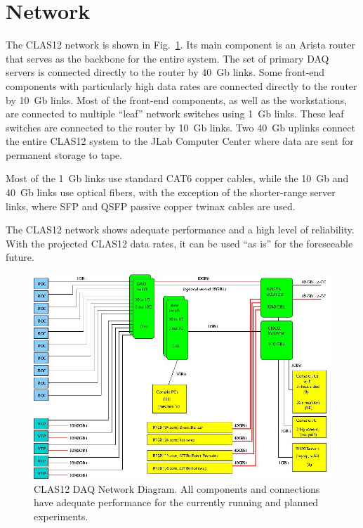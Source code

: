 \section{Network}

The CLAS12 network is shown in Fig.~\ref{fig:network_diagram}. Its main component is an Arista router that serves
as the backbone for the entire system. The set of primary DAQ servers is connected directly to the router by 40~Gb
links. Some front-end components with particularly high data rates are connected directly to the router by 10~Gb links.
Most of the front-end components, as well as the workstations, are connected to multiple ``leaf'' network switches using
1~Gb links. These leaf switches are connected to the router by 10~Gb links. Two 40~Gb uplinks connect the entire
CLAS12 system to the JLab Computer Center where data are sent for permanent storage to tape.

Most of the 1~Gb links use standard CAT6 copper cables, while the 10~Gb and 40~Gb links use optical fibers, with the
exception of the shorter-range server links, where SFP and QSFP passive copper twinax cables are used.

The CLAS12 network shows adequate performance and a high level of reliability. With the projected CLAS12 data rates,
it can be used ``as is'' for the foreseeable future.

\begin{figure}[hbt]
	\centering
	\includegraphics[width=1.0\columnwidth,keepaspectratio]{img/CLAS12_NET_1.jpg}
	\caption{CLAS12 DAQ Network Diagram. All components and connections have adequate performance for the
          currently running and planned experiments.}
	\label{fig:network_diagram}
\end{figure}
